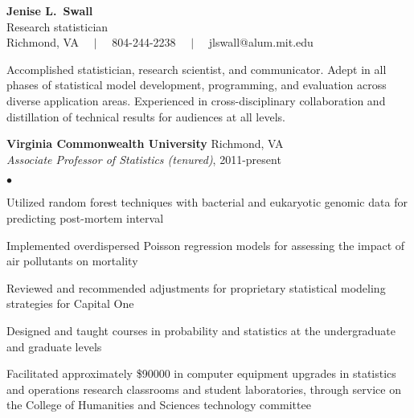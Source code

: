 \documentclass[11pt]{article}
\def\newsectn{\vspace*{0.6cm}}
\def\newempl{\vspace*{0.4cm}}
\begin{document}
\thispagestyle{empty}


\begin{center}
{\Large{\textbf{Jenise L.~Swall}}}\\
{\Large{Research statistician}}\\ \vspace*{0.05in}
Richmond, VA $\quad | \quad$ 804-244-2238 $\quad | \quad$ jlswall@alum.mit.edu\\
\hrulefill
\end{center}




Accomplished statistician, research scientist, and communicator.  Adept in all
phases of statistical model development, programming, and evaluation across
diverse application areas. Experienced in cross-disciplinary collaboration and
distillation of technical results for audiences at all levels.



\newsectn
{} 


\textbf{Virginia Commonwealth University}  \hfill Richmond, VA\\
\textit{Associate Professor of Statistics (tenured)}, 2011-present

\begin{list}{$\bullet$}{
\setlength{\topsep}{0cm}
\setlength{\partopsep}{0cm}
\setlength{\parsep}{0cm}
\setlength{\itemsep}{0cm}
\setlength{\labelsep}{1ex}
\setlength{\labelwidth}{1em}
\setlength{\leftmargin}{1em}
}
\item Utilized random forest techniques with bacterial and eukaryotic genomic data for predicting
post-mortem interval 
\item Implemented overdispersed Poisson regression models for assessing the impact of air pollutants on mortality
\item Reviewed and recommended adjustments for proprietary statistical
  modeling strategies for Capital One
\item Designed and taught courses in probability and statistics at the
undergraduate and graduate levels
\item Facilitated approximately \$90000 in computer equipment upgrades in statistics and operations research classrooms and student laboratories, through service on the College of Humanities and Sciences technology committee 
\end{list}
\end{document}

